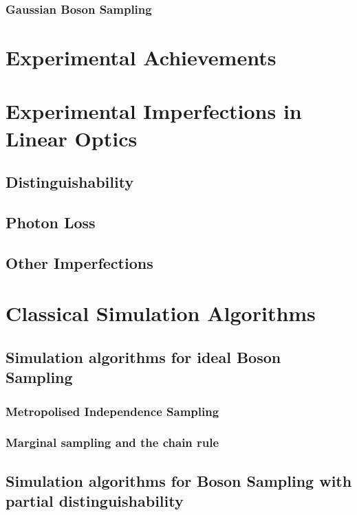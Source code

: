 \subsubsection{Gaussian Boson Sampling}

\section{Experimental Achievements}

\section{Experimental Imperfections in Linear Optics}

\subsection{Distinguishability}

\subsection{Photon Loss}

\subsection{Other Imperfections}

\section{Classical Simulation Algorithms}

\subsection{Simulation algorithms for ideal Boson Sampling}

\subsubsection{Metropolised Independence Sampling}

\subsubsection{Marginal sampling and the chain rule}

\subsection{Simulation algorithms for Boson Sampling with partial distinguishability}

